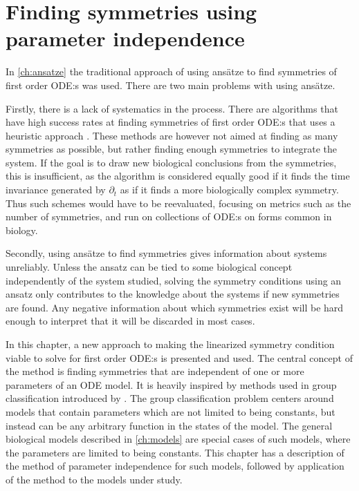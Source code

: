 \chapter{Finding symmetries using parameter independence} \label{ch:param-ind}

In \cref{ch:ansatze} the traditional approach of using ansätze to find symmetries of first order ODE:s was used.
There are two main problems with using ansätze.

Firstly, there is a lack of systematics in the process.
There are algorithms that have high success rates at finding symmetries of first order ODE:s that uses a heuristic approach \cite{chebterrab1997computer,chebterrab1998patterns}.
These methods are however not aimed at finding as many symmetries as possible, but rather finding enough symmetries to integrate the system.
If the goal is to draw new biological conclusions from the symmetries, this is insufficient, as the algorithm is considered equally good if it finds the time invariance generated by \(\partial_t\) as if it finds a more biologically complex symmetry.
Thus such schemes would have to be reevaluated, focusing on metrics such as the number of symmetries, and run on collections of ODE:s on forms common in biology.

Secondly, using ansätze to find symmetries gives information about systems unreliably.
Unless the ansatz can be tied to some biological concept independently of the system studied, solving the symmetry conditions using an ansatz only contributes to the knowledge about the systems if new symmetries are found.
Any negative information about which symmetries exist will be hard enough to interpret that it will be discarded in most cases.

In this chapter, a new approach to making the linearized symmetry condition viable to solve for first order ODE:s is presented and used.
The central concept of the method is finding symmetries that are independent of one or more parameters of an ODE model.
It is heavily inspired by methods used in group classification introduced by \citeauthor{ovsiannikov1982group} \cite{ovsiannikov1982group}.
The group classification problem centers around models that contain parameters which are not limited to being constants, but instead can be any arbitrary function in the states of the model.
The general biological models described in \cref{ch:models} are special cases of such models, where the parameters are limited to being constants.
This chapter has a description of the method of parameter independence for such models, followed by application of the method to the models under study.

